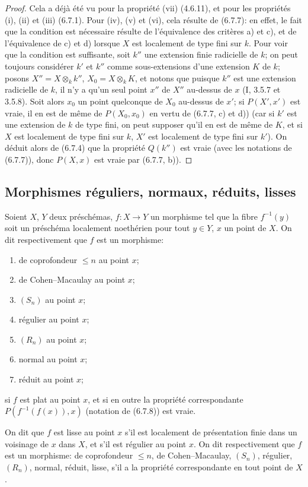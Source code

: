 \begin{proof}
Cela a déjà été vu pour la propriété (vii) (4.6.11), et pour les propriétés
(i), (ii) et (iii) (6.7.1). Pour (iv), (v) et (vi), cela résulte de (6.7.7):
en effet, le fait que la condition est nécessaire résulte de l'équivalence des
critères a) et c), et de l'équivalence de c) et d) lorsque $X$ est localement
de type fini sur $k$. Pour voir que la condition est suffisante, soit $k''$ une
extension finie radicielle de $k$; on peut toujours considérer $k'$ et $k''$
comme sous-extensions d'une extension $K$ de $k$; posons
$X''=X\otimes_k k''$, $X_0=X\otimes_k K$, et notons que puisque $k''$ est une
extension radicielle de $k$, il n'y a qu'un seul point $x''$ de $X''$ au-dessus
de $x$ (I, 3.5.7 et 3.5.8). Soit alors $x_0$ un point quelconque de $X_0$
au-dessus de $x'$; si $P(X',x')$ est vraie, il en est de même de $P(X_0,x_0)$
en vertu de (6.7.7, c) et d)) (car si $k'$ est une extension de $k$ de type
fini, on peut supposer qu'il en est de même de $K$, et si $X$ est localement
de type fini sur $k$, $X'$ est localement de type fini sur $k'$). On déduit
alors de (6.7.4) que la propriété $Q(k'')$ est vraie (avec les notations de
(6.7.7)), donc $P(X,x)$ est vraie par (6.7.7, b)).
\end{proof}

\subsection{Morphismes réguliers, normaux, réduits, lisses}
\label{subsection:IV.6.8}


\begin{definition}[6.8.1]
\label{IV.2.s6.8.1-fr}
Soient $X$, $Y$ deux préschémas, $f:X\to Y$ un morphisme tel que la fibre
$f^{-1}(y)$ soit un préschéma localement noethérien pour tout $y\in Y$, $x$
un point de $X$. On dit respectivement que $f$ est un morphisme:
\begin{enumerate}
\item[(i)] de coprofondeur $\leq n$ au point $x$;
\item[(ii)] de Cohen--Macaulay au point $x$;
\item[(iii)] $(S_n)$ au point $x$;
\item[(iv)] régulier au point $x$;
\item[(v)] $(R_n)$ au point $x$;
\item[(vi)] normal au point $x$;
\item[(vii)] réduit au point $x$;
\end{enumerate}
si $f$ est plat au point $x$, et si en outre la propriété correspondante
$P(f^{-1}(f(x)),x)$ (notation de (6.7.8)) est vraie.

On dit que $f$ est lisse au point $x$ s'il est localement de présentation finie
dans un voisinage de $x$ dans $X$, et s'il est régulier au point $x$. On dit
respectivement que $f$ est un morphisme: de coprofondeur $\leq n$, de
Cohen--Macaulay, $(S_n)$, régulier, $(R_n)$, normal, réduit, lisse, s'il a la
propriété correspondante en tout point de $X$.
\end{definition}

